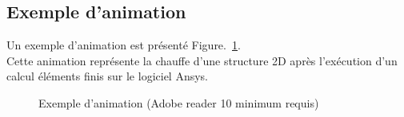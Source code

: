 \documentclass[a4paper,12pt]{report}
\begin{document}
\subsection{Exemple d'animation}

Un exemple d'animation est présenté Figure.~\ref{Fig_animation}. \\

Cette animation représente la chauffe d'une structure 2D après l'exécution d'un calcul éléments finis sur le logiciel Ansys. \\


\begin{figure}[hbtp]
\begin{center}
\caption{Exemple d'animation (Adobe reader 10 minimum requis)} 
\label{Fig_animation} 
\end{center}  
\end{figure}


\end{document}
